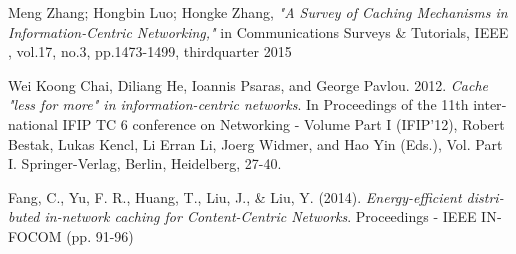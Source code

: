 \begin{thebibliography}{99}
\begin{latin}
Meng Zhang; Hongbin Luo; Hongke Zhang, \textit{"A Survey of Caching Mechanisms in Information-Centric Networking,"} in Communications Surveys \& Tutorials, IEEE , vol.17, no.3, pp.1473-1499, thirdquarter 2015

Wei Koong Chai, Diliang He, Ioannis Psaras, and George Pavlou. 2012. \textit{Cache "less for more" in information-centric networks}. In Proceedings of the 11th international IFIP TC 6 conference on Networking - Volume Part I (IFIP'12), Robert Bestak, Lukas Kencl, Li Erran Li, Joerg Widmer, and Hao Yin (Eds.), Vol. Part I. Springer-Verlag, Berlin, Heidelberg, 27-40. 

Fang, C., Yu, F. R., Huang, T., Liu, J., \& Liu, Y. (2014). \textit{Energy-efficient distributed in-network caching for Content-Centric Networks}. Proceedings - IEEE INFOCOM (pp. 91-96)

\end{latin}


\end{thebibliography}